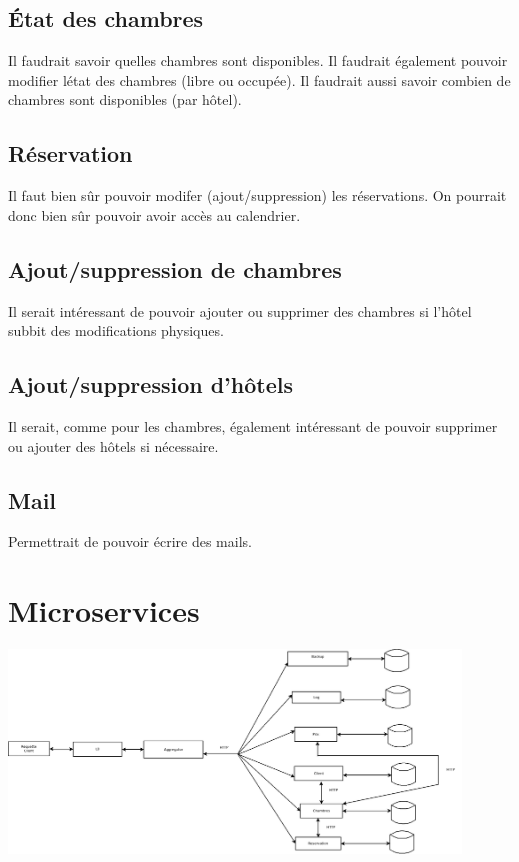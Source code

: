 \documentclass{article}
\begin{document}
\subsection{\'Etat des chambres}
Il faudrait savoir quelles chambres sont disponibles. Il faudrait \'egalement pouvoir modifier l\'etat des chambres (libre ou occup\'ee). Il faudrait aussi savoir combien de chambres sont disponibles (par h\^{o}tel).


\subsection{R\'eservation}
Il faut bien s\^{u}r pouvoir modifer (ajout/suppression) les r\'eservations. On pourrait donc bien s\^{u}r pouvoir  avoir acc\`es au calendrier.


\subsection{Ajout/suppression de chambres}
Il serait int\'eressant de pouvoir ajouter ou supprimer des chambres si l'h\^{o}tel subbit des modifications physiques.


\subsection{Ajout/suppression d'h\^{o}tels}
Il serait, comme pour les chambres, \'egalement int\'eressant de pouvoir supprimer ou ajouter des h\^{o}tels si n\'ecessaire.


\subsection{Mail}
Permettrait de pouvoir \'ecrire des mails.

\section{Microservices}
\includegraphics[width=12cm]{microservices.png} \\
\end{document}
